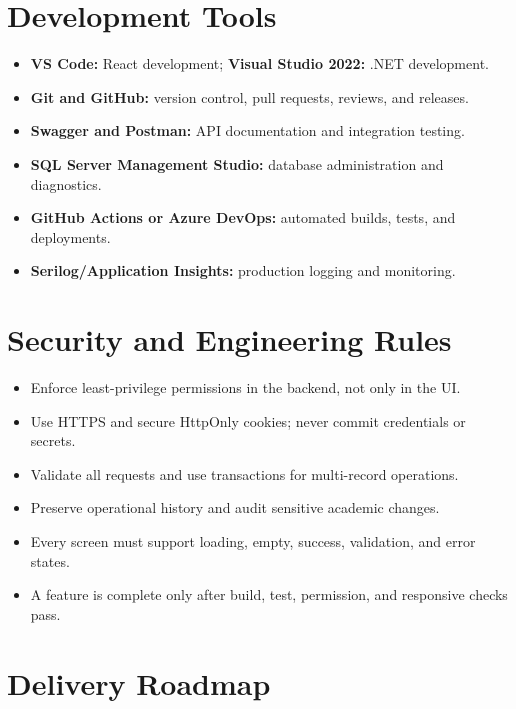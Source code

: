 \documentclass[10pt,a4paper]{article}
\begin{document}
\section{Development Tools}

\begin{itemize}
  \item \textbf{VS Code:} React development; \textbf{Visual Studio 2022:} .NET development.
  \item \textbf{Git and GitHub:} version control, pull requests, reviews, and releases.
  \item \textbf{Swagger and Postman:} API documentation and integration testing.
  \item \textbf{SQL Server Management Studio:} database administration and diagnostics.
  \item \textbf{GitHub Actions or Azure DevOps:} automated builds, tests, and deployments.
  \item \textbf{Serilog/Application Insights:} production logging and monitoring.
\end{itemize}

\newpage
\section{Security and Engineering Rules}

\begin{itemize}
  \item Enforce least-privilege permissions in the backend, not only in the UI.
  \item Use HTTPS and secure HttpOnly cookies; never commit credentials or secrets.
  \item Validate all requests and use transactions for multi-record operations.
  \item Preserve operational history and audit sensitive academic changes.
  \item Every screen must support loading, empty, success, validation, and error states.
  \item A feature is complete only after build, test, permission, and responsive checks pass.
\end{itemize}

\section{Delivery Roadmap}
\end{document}
